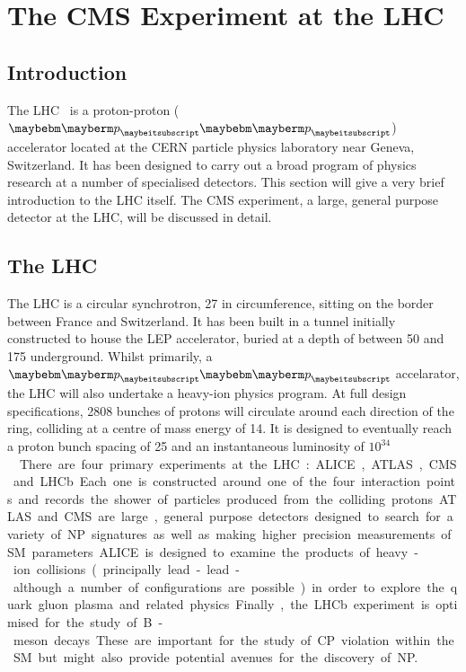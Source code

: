 \chapter{The \acl{CMS} Experiment at the \acl{LHC}}
\label{sec:experiment}
\section{Introduction}
The \acf{LHC}~\cite{lhc_design_report} is a proton-proton ($\Pp\Pp$) accelerator
located at the CERN particle physics laboratory near Geneva, Switzerland. It has
been designed to carry out a broad program of physics research at a number of
specialised detectors. This section will give a very brief introduction to the
\ac{LHC} itself. The \acf{CMS} experiment, a large, general purpose detector at
the \ac{LHC}, will be discussed in detail.

\section{The \acl{LHC}}
The \ac{LHC} is a circular synchrotron, \unit{27}{\kilo\metre} in circumference,
sitting on the border between France and Switzerland. It has been built in a
tunnel initially constructed to house the \ac{LEP} accelerator, buried at a
depth of between 50 and \unit{175}{\metre} underground. Whilst primarily, a
$\Pp\Pp$ accelarator, the \ac{LHC} will also undertake a heavy-ion physics
program. At full design specifications, 2808 bunches of protons will circulate
around each direction of the ring, colliding at a centre of mass energy of
\unit{14}{\TeV}. It is designed to eventually reach a proton bunch spacing of
\unit{25}{\ns} and an instantaneous luminosity of
\unit{$10^{34}$}{\rpsquare{\centi\metre}\usk\reciprocal\second}.

There are four primary experiments at the LHC: \ac{ALICE}, \ac{ATLAS}, \ac{CMS}
and \ac{LHCb}. Each one is constructed around one of the four interaction points
and records the shower of particles produced from the colliding protons. ATLAS
and CMS are large, general purpose detectors designed to search for a variety of
\ac{NP} signatures as well as making higher precision measurements of \ac{SM}
parameters. \ac{ALICE} is designed to examine the products of heavy-ion
collisions (principally lead-lead - although a number of configurations are
possible) in order to explore the quark gluon plasma and related
physics. Finally, the \ac{LHCb} experiment is optimised for the study of B-meson
decays. These are important for the study of CP violation within the \ac{SM} but
might also provide potential avenues for the discovery of \ac{NP}.

